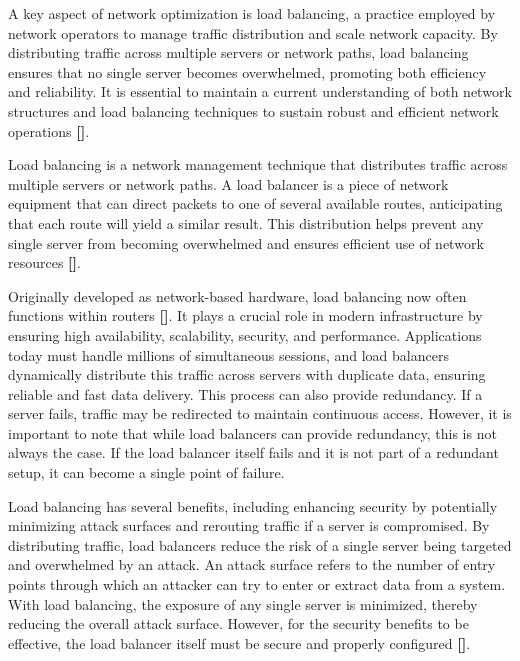 \documentclass[12pt]{cwru_thesis}
\begin{document}
A key aspect of network optimization is load balancing, a practice employed by network operators to manage traffic distribution and scale network capacity. By distributing traffic across multiple servers or network paths, load balancing ensures that no single server becomes overwhelmed, promoting both efficiency and reliability. It is essential to maintain a current understanding of both network structures and load balancing techniques to sustain robust and efficient network operations \textbf{[\cite{10371400}]}.

Load balancing is a network management technique that distributes traffic across multiple servers or network paths. A load balancer is a piece of network equipment that can direct packets to one of several available routes, anticipating that each route will yield a similar result. This distribution helps prevent any single server from becoming overwhelmed and ensures efficient use of network resources \textbf{[\cite{f52023loadbalancing}]}.

Originally developed as network-based hardware, load balancing now often functions within routers \textbf{[\cite{bourke2001server}]}. It plays a crucial role in modern infrastructure by ensuring high availability, scalability, security, and performance. Applications today must handle millions of simultaneous sessions, and load balancers dynamically distribute this traffic across servers with duplicate data, ensuring reliable and fast data delivery. This process can also provide redundancy. If a server fails, traffic may be redirected to maintain continuous access. However, it is important to note that while load balancers can provide redundancy, this is not always the case. If the load balancer itself fails and it is not part of a redundant setup, it can become a single point of failure.

Load balancing has several benefits, including enhancing security by potentially minimizing attack surfaces and rerouting traffic if a server is compromised. By distributing traffic, load balancers reduce the risk of a single server being targeted and overwhelmed by an attack. An attack surface refers to the number of entry points through which an attacker can try to enter or extract data from a system. With load balancing, the exposure of any single server is minimized, thereby reducing the overall attack surface. However, for the security benefits to be effective, the load balancer itself must be secure and properly configured \textbf{[\cite{10.1145/3098593.3098595}]}.
\end{document}
